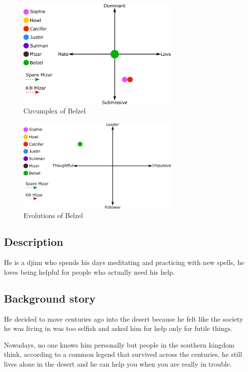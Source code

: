 \begin{figure}[H]
  \centering
  \includegraphics[width=8cm]{Images/Circumplexes/belzelCircumplex}
  \caption{Circumplex of Belzel}
\end{figure}

\begin{figure}[H]
   \centering
   \includegraphics[width=8cm]{Images/Evolutions/belzelEvolution}
   \caption{Evolutions of Belzel}
\end{figure}

\subsection{Description}
He is a djinn who spends his days meditating and practicing with new spells, he loves being helpful for people who actually need his help. 

\subsection{Background story}
He decided to move centuries ago into the desert because he felt like the society he was living in was too selfish and asked him for help only for futile things.

Nowadays, no one knows him personally but people in the southern kingdom think, according to a common legend that survived across the centuries, he still lives alone in the desert and he can help you when you are really in trouble.

